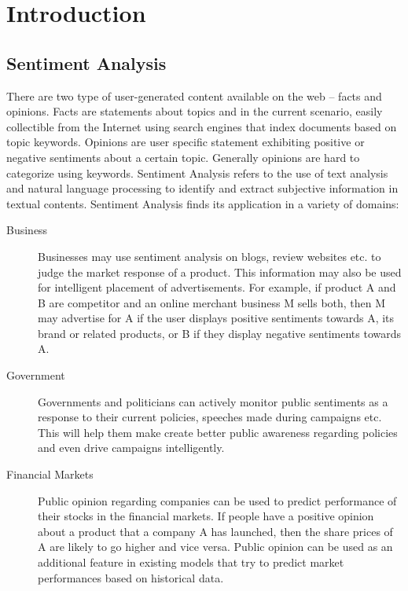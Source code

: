 \section{Introduction}

\subsection{Sentiment Analysis}
There are two type of user-generated content available on the web – facts and opinions.
Facts are statements about topics and in the current scenario, easily collectible from the Internet
	using search engines that index documents based on topic keywords.
Opinions are user specific statement exhibiting positive or negative sentiments about a certain topic.
Generally opinions are hard to categorize using keywords. %
Sentiment Analysis refers to the use of text analysis and natural language processing
	to identify and extract subjective information in textual contents. %
Sentiment Analysis finds its application in a variety of domains:

\begin{description}
\item[Business]{
Businesses may use sentiment analysis on blogs, review websites etc. to judge the market response of a product.
This information may also be used for intelligent placement of advertisements.
For example, if product A and B are competitor and an online merchant business M sells both,
	then M may advertise for A if the user displays positive sentiments towards A, its brand or related products,
	or B if they display negative sentiments towards A.
}
\item[Government]{
Governments and politicians can actively monitor public sentiments as a response to their current policies, speeches made during campaigns etc. This will help them make create better public awareness regarding policies and even drive campaigns intelligently.
}
\item[Financial Markets]{
Public opinion regarding companies can be used to predict performance of their stocks in the financial markets. If people have a positive opinion about a product that a company A has launched, then the share prices of A are likely to go higher and vice versa. Public opinion can be used as an additional feature in existing models that try to predict market performances based on historical data.
}
\end{description}

